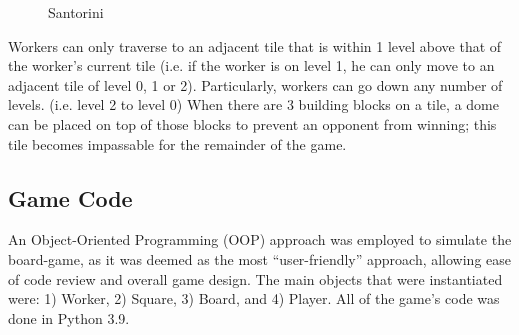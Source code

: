 \documentclass[a4paper,12pt,table]{article}
\begin{document}
\begin{figure}[H]
    \centering
    \qquad
    \caption{Santorini \cite{Santorini Rule Book}}
    \label{fig:}
\end{figure}

Workers can only traverse to an adjacent tile that is within 1 level above that of the worker’s current tile (i.e. if the worker is on level 1, he can only move to an adjacent tile of level 0, 1 or 2). Particularly, workers can go down any number of levels. (i.e. level 2 to level 0) When there are 3 building blocks on a tile, a dome can be placed on top of those blocks to prevent an opponent from winning; this tile becomes impassable for the remainder of the game. \par

\subsection{Game Code}

An Object-Oriented Programming (OOP) approach was employed to simulate the board-game, as it was deemed as the most “user-friendly” approach, allowing ease of code review and overall game design. The main objects that were instantiated were: 1) Worker, 2) Square, 3) Board, and 4) Player. All of the game’s code was done in Python 3.9. \par
\end{document}
